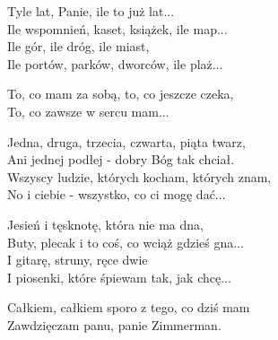 \begin{text}
    Tyle lat, Panie, ile to już lat...\\
    Ile wspomnień, kaset, książek, ile map...\\
    Ile gór, ile dróg, ile miast,\\
    Ile portów, parków, dworców, ile plaż...

    To, co mam za sobą, to, co jeszcze czeka,\\
    To, co zawsze w sercu mam...

    Jedna, druga, trzecia, czwarta, piąta twarz,\\
    Ani jednej podłej - dobry Bóg tak chciał.\\
    Wszyscy ludzie, których kocham, których znam,\\
    No i ciebie - wszystko, co ci mogę dać...

    Jesień i tęsknotę, która nie ma dna,\\
    Buty, plecak i to coś, co wciąż gdzieś gna...\\
    I gitarę, struny, ręce dwie\\
    I piosenki, które śpiewam tak, jak chcę...

    Całkiem, całkiem sporo z tego, co dziś mam\\
    Zawdzięczam panu, panie Zimmerman.
\end{text}
\begin{chord}

\end{chord}